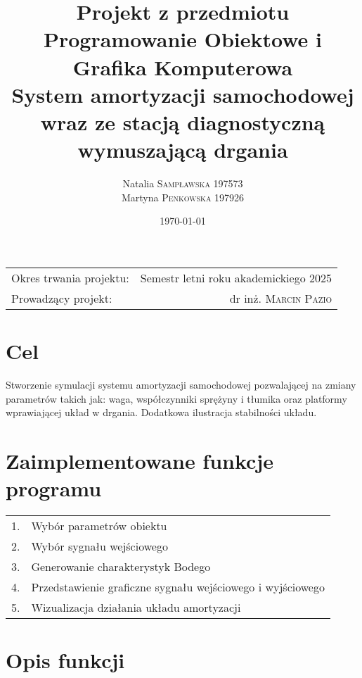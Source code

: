 \documentclass[10pt, a4paper]{article}
\title{
  \textbf{Projekt z przedmiotu Programowanie Obiektowe i Grafika Komputerowa
} \\
  \large System amortyzacji samochodowej wraz ze stacją diagnostyczną wymuszającą drgania
}
\author{
  Natalia \textsc{Sampławska 197573} \\
  Martyna \textsc{Penkowska 197926}
}
\date{\today}
\begin{document}
\maketitle

\begin{center}
  \begin{tabular}{l r}
    Okres trwania projektu: & Semestr letni roku akademickiego 2025 \\
    Prowadzący projekt: & dr inż. \textsc{Marcin Pazio}
  \end{tabular}
\end{center}

\vspace{0.1cm}


\section{Cel}

Stworzenie symulacji systemu amortyzacji samochodowej pozwalającej na zmiany parametrów takich jak: waga, współczynniki sprężyny i tłumika oraz platformy wprawiającej układ w drgania. Dodatkowa ilustracja stabilności układu. 


\section{Zaimplementowane funkcje programu}


\begin{tabular}{l l}
	1. & Wybór parametrów obiektu\\ 
	2. & Wybór sygnału wejściowego\\
	3. & Generowanie charakterystyk Bodego\\
	4. & Przedstawienie graficzne sygnału wejściowego i wyjściowego\\
	5. & Wizualizacja działania układu amortyzacji\\
\end{tabular}


\section{Opis funkcji}
\end{document}
